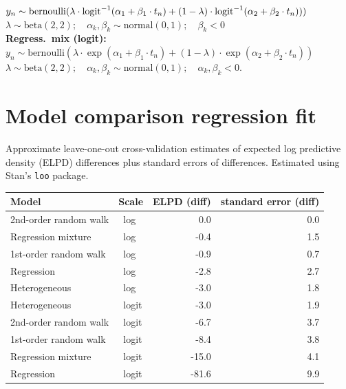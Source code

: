 \documentclass[plainboxedsections]{sciposter}
\begin{document}
\begin{multicols}{2}
$y_n \sim \textrm{bernoulli}(\lambda \cdot \textrm{logit}^{-1}(\alpha_1 + \beta_1 \cdot t_n) + (1 - \lambda) \cdot \textrm{logit}^{-1}(\alpha_2 + \beta_2 \cdot t_n)))$
\\[2pt]
\null\qquad\qquad\qquad\qquad $\lambda \sim \textrm{beta}(2, 2); 
\quad \alpha_k, \beta_k \sim \textrm{normal}(0, 1); 
\quad \beta_k < 0$
\\[12pt]
{\bfseries Regress.\ mix (logit):}
$y_n \sim \textrm{bernoulli}(\lambda \cdot \exp(\alpha_1 + \beta_1 \cdot t_n) + (1 - \lambda) \cdot \exp(\alpha_2 + \beta_2 \cdot t_n))$
\\[2pt]
\null\qquad\qquad\qquad\qquad $\lambda \sim \textrm{beta}(2, 2); 
\quad \alpha_k, \beta_k \sim \textrm{normal}(0, 1); 
\quad \alpha_k, \beta_k < 0.$



\section{Model comparison regression fit}

Approximate leave-one-out cross-validation estimates of expected log
predictive density (ELPD) differences plus standard
errors of differences.  Estimated using Stan's \texttt{loo} package.
\vspace*{12pt}
\begin{center}
\renewcommand{\arraystretch}{1.4}
\begin{tabular}{ll|rr}
\hline
Model & Scale & ELPD (diff) & standard error (diff)
\\ \hline
2nd-order random walk & \ log &  0.0 & 0.0
\\
Regression mixture & \ log &   -0.4 &      1.5  
\\
1st-order random walk & \ log        &         -0.9 &       0.7  
\\
Regression & \ log &   -2.8  &     2.7  
\\
Heterogeneous & \ log & -3.0     &  1.8  
\\ \hline
Heterogeneous & \ logit &    -3.0    &   1.9  
\\
2nd-order random walk & \ logit  & -6.7     &  3.7  
\\
1st-order random walk & \ logit              & -8.4      & 3.8  
\\
Regression mixture & \ logit  & -15.0  &     4.1  
\\
Regression & \ logit & -81.6   &    9.9
\\ \hline
\end{tabular}


\end{center}
\end{multicols}
\end{document}
